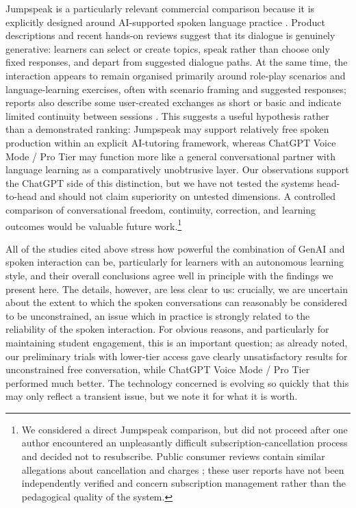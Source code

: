 \documentclass[11pt,a4paper]{article}
\begin{document}
Jumpspeak is a particularly relevant commercial comparison because it is explicitly designed around AI-supported spoken language practice \citep{Jumpspeak2026,JumpspeakAppStore2026}. Product descriptions and recent hands-on reviews suggest that its dialogue is genuinely generative: learners can select or create topics, speak rather than choose only fixed responses, and depart from suggested dialogue paths. At the same time, the interaction appears to remain organised primarily around role-play scenarios and language-learning exercises, often with scenario framing and suggested responses; reports also describe some user-created exchanges as short or basic and indicate limited continuity between sessions \citep{LangolyJumpspeak2026}. This suggests a useful hypothesis rather than a demonstrated ranking: Jumpspeak may support relatively free spoken production within an explicit AI-tutoring framework, whereas ChatGPT Voice Mode / Pro Tier may function more like a general conversational partner with language learning as a comparatively unobtrusive layer. Our observations support the ChatGPT side of this distinction, but we have not tested the systems head-to-head and should not claim superiority on untested dimensions. A controlled comparison of conversational freedom, continuity, correction, and learning outcomes would be valuable future work.\footnote{We considered a direct Jumpspeak comparison, but did not proceed after one author encountered an unpleasantly difficult subscription-cancellation process and decided not to resubscribe. Public consumer reviews contain similar allegations about cancellation and charges \citep{TrustpilotJumpspeak2026}; these user reports have not been independently verified and concern subscription management rather than the pedagogical quality of the system.}

All of the studies cited above stress how powerful the combination of GenAI and spoken interaction can be, particularly for learners with an autonomous learning style, and their overall conclusions agree well in principle with the findings we present here. The details, however, are less clear to us: crucially, we are uncertain about the extent to which the spoken conversations can reasonably be considered to be unconstrained, an issue which in practice is strongly related to the reliability of the spoken interaction. For obvious reasons, and particularly for maintaining student engagement, this is an important question; as already noted, our preliminary trials with lower-tier access gave clearly unsatisfactory results for unconstrained free conversation, while ChatGPT Voice Mode / Pro Tier performed much better. The technology concerned is evolving so quickly that this may only reflect a transient issue, but we note it for what it is worth.
\end{document}
